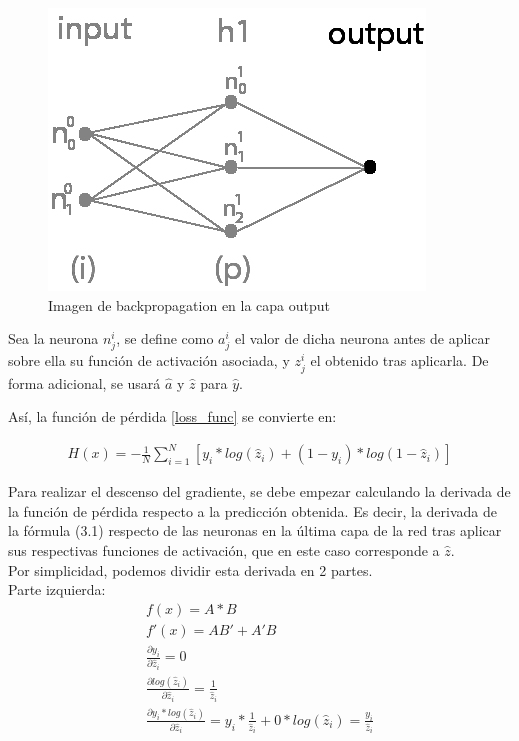 \begin{figure}[H]
	\centering
	\includegraphics[scale=0.35]{imagenes/nn_1_capa_output.jpg}  
	\caption{Imagen de backpropagation en la capa output}
	\label{fig:nn_1_capa_output}
\end{figure}

Sea la neurona $n^i_j$, se define como $a^i_j$ el valor de dicha neurona antes de aplicar sobre ella su función de activación asociada, y $z^i_j$ el obtenido tras aplicarla. De forma adicional, se usará $\hat{a}$ y $\hat{z}$ para $\hat{y}$.

Así, la función de pérdida \ref{loss_func} se convierte en:

\begin{gather}
	H(x) = - \frac{1}{N} \sum_{i=1}^{N}  [y_i * log( \hat{z}_i) + (1-y_i)*log(1-\hat{z}_i)]
	\label{loss_func_az}
\end{gather}

Para realizar el descenso del gradiente, se debe empezar calculando la derivada de la función de pérdida respecto a la predicción obtenida. Es decir, la derivada de la fórmula (3.1) respecto de las neuronas en la última capa de la red tras aplicar sus respectivas funciones de activación, que en este caso corresponde a $\hat{z}$. \\
Por simplicidad, podemos dividir esta derivada en 2 partes. \\
Parte izquierda:
\begin{gather}
	f(x) = A*B \\  
	f'(x) = AB' + A'B \\
	\frac{\partial y_i}{\partial \hat{z}_i} = 0 \\
	\frac{\partial log(\hat{z}_i)}{\partial \hat{z}_i} = \frac{1}{\hat{z}_i} \\
	\frac{\partial y_i * log( \hat{z}_i)}{\partial \hat{z}_i} = y_i*\frac{1}{\hat{z}_i} + 0*log(\hat{z}_i) = \frac{y_i}{\hat{z}_i}
\end{gather}

